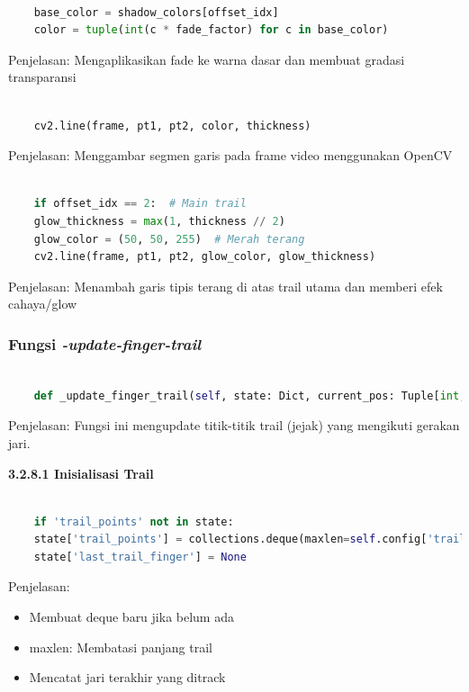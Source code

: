 \documentclass[11pt,a4paper]{article}
\begin{document}
    \begin{lstlisting}[language=Python, caption=Warna dengan Fade]
    
    base_color = shadow_colors[offset_idx]
    color = tuple(int(c * fade_factor) for c in base_color)
    \end{lstlisting}
    Penjelasan:
    Mengaplikasikan fade ke warna dasar dan membuat gradasi transparansi

    \begin{lstlisting}[language=Python, caption=Main Loop]
    
    cv2.line(frame, pt1, pt2, color, thickness)
    \end{lstlisting}
    Penjelasan: Menggambar segmen garis pada frame video menggunakan OpenCV

    \begin{lstlisting}[language=Python, caption=Efek Cahaya (Glow)]

    if offset_idx == 2:  # Main trail
    glow_thickness = max(1, thickness // 2)
    glow_color = (50, 50, 255)  # Merah terang
    cv2.line(frame, pt1, pt2, glow_color, glow_thickness)
    \end{lstlisting}
    Penjelasan:
    Menambah garis tipis terang di atas trail utama dan memberi efek cahaya/glow

    \subsubsection{Fungsi \textit{-update-finger-trail}}
    \begin{lstlisting}[language=Python, caption=Fungsi \textit{-update-finger-trail}]
    
    def _update_finger_trail(self, state: Dict, current_pos: Tuple[int, int], current_finger: str) -> None:
    \end{lstlisting}
    Penjelasan:
    Fungsi ini mengupdate titik-titik trail (jejak) yang mengikuti gerakan jari.

    \noindent\textbf{3.2.8.1 Inisialisasi Trail}
    \begin{lstlisting}[language=Python, caption=Inisialisasi Trail]
        
    if 'trail_points' not in state:
    state['trail_points'] = collections.deque(maxlen=self.config['trail_max_length'])
    state['last_trail_finger'] = None
    \end{lstlisting}
    Penjelasan: 
    \begin{itemize}
        \item Membuat deque baru jika belum ada
        \item maxlen: Membatasi panjang trail
        \item Mencatat jari terakhir yang ditrack
    \end{itemize}
\end{document}
